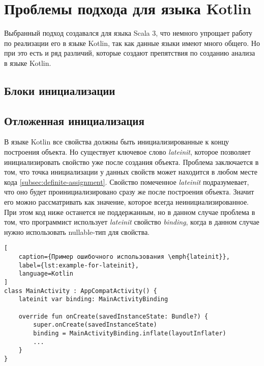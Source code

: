 

\section{Проблемы подхода для языка Kotlin}\label{sec:проблемы-подхода-для-языка-kotlin}

Выбранный подход создавался для языка Scala 3, что немного упрощает работу по реализации его в языке Kotlin,
так как данные языки имеют много общего.
Но при это есть и ряд различий, которые создают препятствия по созданию анализа в языке Kotlin.

\subsection{Блоки инициализации}\label{subsec:блоки-инициализации}

\subsection{Отложенная инициализация}\label{subsec:lateinit}

В языке Kotlin все свойства должны быть инициализированные к концу построения объекта.
Но существует ключевое слово \emph{lateinit}, которое позволяет инициализировать свойство уже после создания объекта.
Проблема заключается в том, что точка инициализации у данных свойств может находится в любом месте кода \autoref{subsec:definite-assignment}.
Свойство помеченное \emph{lateinit} подразумевает,
что оно будет проинициализировано сразу же после построения объекта.
Значит его можно рассматривать как значение, которое всегда неинициализированное.
При этом код ниже останется не поддержанным, но в данном случае проблема в том,
что программист использует \emph{lateinit} свойство \emph{binding},
когда в данном случае нужно использовать nullable-тип для свойства.
\begin{lstlisting}[
    caption={Пример ошибочного использования \emph{lateinit}},
    label={lst:example-for-lateinit},
    language=Kotlin
]
class MainActivity : AppCompatActivity() {
    lateinit var binding: MainActivityBinding

    override fun onCreate(savedInstanceState: Bundle?) {
        super.onCreate(savedInstanceState)
        binding = MainActivityBinding.inflate(layoutInflater)
        ...
    }
}
\end{lstlisting}

